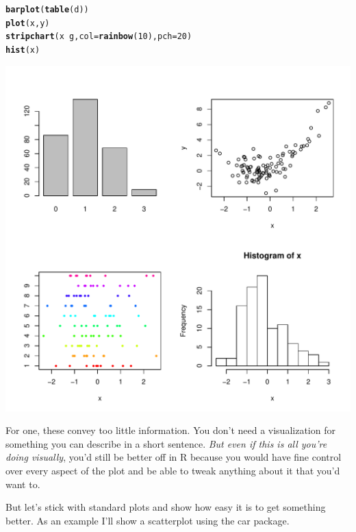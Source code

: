 \documentclass[english,nohyper,titlepage]{tufte-handout}\usepackage[]{graphicx}\usepackage[]{color}
\makeatletter
\def\maxwidth{ %
  \ifdim\Gin@nat@width>\linewidth
    \linewidth
  \else
    \Gin@nat@width
  \fi
}
\newcommand{\hlnum}[1]{\textcolor[rgb]{0.686,0.059,0.569}{#1}}%
\newcommand{\hlopt}[1]{\textcolor[rgb]{0,0,0}{#1}}%
\newcommand{\hlstd}[1]{\textcolor[rgb]{0.345,0.345,0.345}{#1}}%
\newcommand{\hlkwc}[1]{\textcolor[rgb]{0.333,0.667,0.333}{#1}}%
\newcommand{\hlkwd}[1]{\textcolor[rgb]{0.737,0.353,0.396}{\textbf{#1}}}%
\newenvironment{kframe}{%
 \def\at@end@of@kframe{}%
 \ifinner\ifhmode%
  \def\at@end@of@kframe{\end{minipage}}%
  \begin{minipage}{\columnwidth}%
 \fi\fi%
 \def\FrameCommand##1{\hskip\@totalleftmargin \hskip-\fboxsep
 \colorbox{shadecolor}{##1}\hskip-\fboxsep
     \hskip-\linewidth \hskip-\@totalleftmargin \hskip\columnwidth}%
 \MakeFramed {\advance\hsize-\width
   \@totalleftmargin\z@ \linewidth\hsize
   \@setminipage}}%
 {\par\unskip\endMakeFramed%
 \at@end@of@kframe}
\newenvironment{knitrout}{}{} %
\makeatother
\begin{document}
\begin{knitrout}\footnotesize
{}\color{fgcolor}\begin{kframe}
\begin{alltt}
\hlkwd{barplot}\hlstd{(}\hlkwd{table}\hlstd{(d))}
\hlkwd{plot}\hlstd{(x, y)}
\hlkwd{stripchart}\hlstd{(x} \hlopt{~} \hlstd{g,} \hlkwc{col}\hlstd{=}\hlkwd{rainbow}\hlstd{(}\hlnum{10}\hlstd{),} \hlkwc{pch}\hlstd{=}\hlnum{20}\hlstd{)}
\hlkwd{hist}\hlstd{(x)}
\end{alltt}
\end{kframe}
\includegraphics[width=\maxwidth]{figure/basicvis} 

\end{knitrout}

For one, these convey too little information.  You don't need a visualization for something you can describe in a short sentence. \emph{But even if this is all you're doing visually}, you'd still be better off in R because you would have fine control over every aspect of the plot and be able to tweak anything about it that you'd want to.  

But let's stick with standard plots and show how easy it is to get something better. As an example I'll show a scatterplot using the car package.
\end{document}
